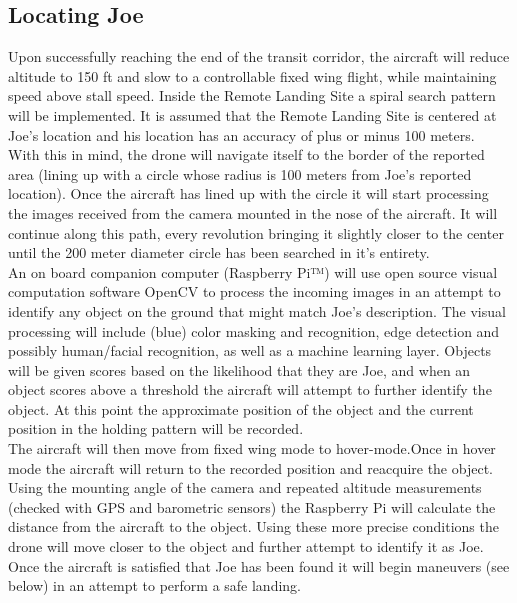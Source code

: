 \subsection{Locating Joe}
Upon successfully reaching the end of the transit corridor, the aircraft will reduce altitude to 150 ft and slow to a controllable fixed wing flight, while maintaining speed above stall speed. Inside the Remote Landing Site a spiral search pattern will be implemented. It is assumed that the Remote Landing Site is centered at Joe's location and his location has an accuracy of plus or minus 100 meters.\\

With this in mind, the drone will navigate itself to the border of the reported area (lining up with a circle whose radius is 100 meters from Joe’s reported location). Once the aircraft has lined up with the circle it will start processing the images received from the camera mounted in the nose of the aircraft. It will continue along this path, every revolution bringing it slightly closer to the center until the 200 meter diameter circle has been searched in it’s entirety.\\

An on board companion computer (Raspberry Pi™) will use open source visual computation software OpenCV to process the incoming images in an attempt to identify any object on the ground that might match Joe's description. The visual processing will include (blue) color masking and recognition, edge detection and possibly human/facial recognition, as well as a machine learning layer. Objects will be given scores based on the likelihood that they are Joe, and when an object scores above a threshold the aircraft will attempt to further identify the object. At this point the approximate position of the object and the current position in the holding pattern will be recorded.\\

The aircraft will then move from fixed wing mode to hover-mode.Once in hover mode the aircraft will return to the recorded position and reacquire the object. Using the mounting angle of the camera and repeated altitude measurements (checked with GPS and barometric sensors) the Raspberry Pi will calculate the distance from the aircraft to the object. Using these more precise conditions the drone will move closer to the object and further attempt to identify it as Joe. Once the aircraft is satisfied that Joe has been found it will begin maneuvers (see below) in an attempt to perform a safe landing.\\

